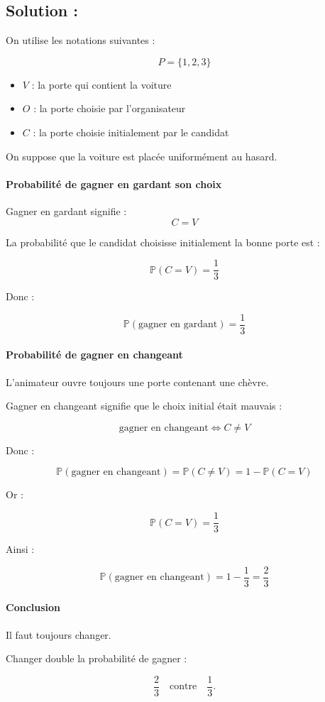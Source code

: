 \subsection*{Solution :}

On utilise les notations suivantes :

\[
P = \{1,2,3\}
\]

\begin{itemize}
\item $V$ : la porte qui contient la voiture
\item $O$ : la porte choisie par l'organisateur
\item $C$ : la porte choisie initialement par le candidat
\end{itemize}


On suppose que la voiture est placée uniformément au hasard.

\paragraph{Probabilité de gagner en gardant son choix}

Gagner en gardant signifie :
\[
C = V
\]

La probabilité que le candidat choisisse initialement la bonne porte est :

\[
\mathbb{P}(C = V) = \frac{1}{3}
\]

Donc :

\[
\boxed{\mathbb{P}(\text{gagner en gardant}) = \frac{1}{3}}
\]

\paragraph{Probabilité de gagner en changeant}

L’animateur ouvre toujours une porte contenant une chèvre.

Gagner en changeant signifie que le choix initial était mauvais :

\[
\text{gagner en changeant} \iff C \neq V
\]

Donc :

\[
\mathbb{P}(\text{gagner en changeant})
= \mathbb{P}(C \neq V)
= 1 - \mathbb{P}(C = V)
\]

Or :

\[
\mathbb{P}(C = V) = \frac{1}{3}
\]

Ainsi :

\[
\boxed{\mathbb{P}(\text{gagner en changeant}) = 1 - \frac{1}{3} = \frac{2}{3}}
\]

\paragraph{Conclusion}

Il faut toujours changer.

Changer double la probabilité de gagner :

\[
\frac{2}{3} \quad \text{contre} \quad \frac{1}{3}.
\]

